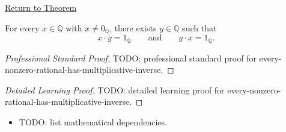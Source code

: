 \newpage
{}
\label{prf:every-nonzero-rational-has-multiplicative-inverse}

\begin{remark*}[Return]
\hyperref[thm:every-nonzero-rational-has-multiplicative-inverse]{Return to Theorem}
\end{remark*}

\begin{theorem*}
For every $x\in\mathbb{Q}$ with $x\ne 0_{\mathbb{Q}}$, there exists
$y\in\mathbb{Q}$ such that
\[
x\cdot y=1_{\mathbb{Q}}
\qquad\text{and}\qquad
y\cdot x=1_{\mathbb{Q}}.
\]
\end{theorem*}

\begin{proof}[Professional Standard Proof]
\LRAProofBodyStart
TODO: professional standard proof for every-nonzero-rational-has-multiplicative-inverse.
\end{proof}

\begin{proof}[Detailed Learning Proof]
\LRAProofBodyStart
TODO: detailed learning proof for every-nonzero-rational-has-multiplicative-inverse.
\end{proof}

\begin{remark*}
\end{remark*}

\begin{dependencies}
\begin{itemize}
  \item TODO: list mathematical dependencies.
\end{itemize}
\end{dependencies}

\clearpage
